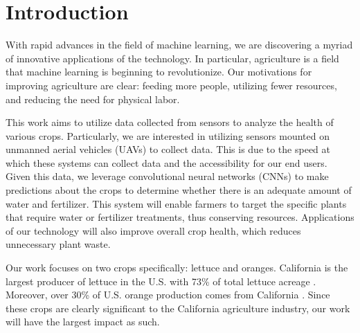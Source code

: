\chapter{Introduction}
With rapid advances in the field of machine learning, we are discovering a myriad of innovative applications of the technology. In particular, agriculture is a field that machine learning is beginning to revolutionize. Our motivations for improving agriculture are clear: feeding more people, utilizing fewer resources, and reducing the need for physical labor.

This work aims to utilize data collected from sensors to analyze the health of various crops. Particularly, we are interested in utilizing sensors mounted on unmanned aerial vehicles (UAVs) to collect data. This is due to the speed at which these systems can collect data and the accessibility for our end users. Given this data, we leverage convolutional neural networks (CNNs) to make predictions about the crops to determine whether there is an adequate amount of water and fertilizer. This system will enable farmers to target the specific plants that require water or fertilizer treatments, thus conserving resources. Applications of our technology will also improve overall crop health, which reduces unnecessary plant waste.

Our work focuses on two crops specifically: lettuce and oranges. California is the largest producer of lettuce in the U.S. with 73\% of total lettuce acreage \cite{Lettuce}. Moreover, over 30\% of U.S. orange production comes from California \cite{Orange}. Since these crops are clearly significant to the California agriculture industry, our work will have the largest impact as such.